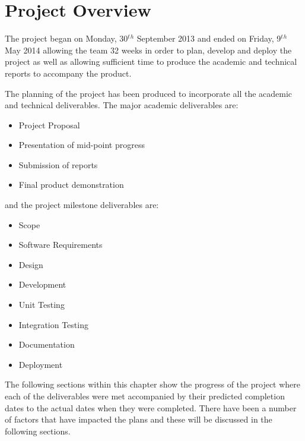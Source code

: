 \section{Project Overview}
\label{sec:project_overview}

The project began on Monday, 30$^t$$^h$ September 2013 and ended on Friday,
9$^t$$^h$ May 2014 allowing the team 32 weeks in order to plan, develop and
deploy the project as well as allowing sufficient time to produce the academic
and technical reports to accompany the product.

The planning of the project has been produced to incorporate all the academic
and technical deliverables. The major academic deliverables are:

\begin{itemize}
  \item Project Proposal
  \item Presentation of mid-point progress
  \item Submission of reports
  \item Final product demonstration
\end{itemize}

and the project milestone deliverables are:

\begin{itemize}
  \item Scope
  \item Software Requirements
  \item Design
  \item Development
  \item Unit Testing
  \item Integration Testing
  \item Documentation
  \item Deployment
\end{itemize}

The following sections within this chapter show the progress of the project
where each of the deliverables were met accompanied by their predicted
completion dates to the actual dates when they were completed. There have been a
number of factors that have impacted the plans and these will be discussed in the following sections.
